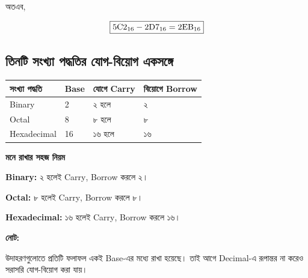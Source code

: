 অতএব,

\[
\boxed{
5\text{\textenglish{C}}2_{16}
-
2\text{\textenglish{D}}7_{16}
=
2\text{\textenglish{EB}}_{16}
}
\]


\subsection{তিনটি সংখ্যা পদ্ধতির যোগ-বিয়োগ একসঙ্গে}

\begin{center}
\begin{tabularx}{\textwidth}{|Y|C{0.13\textwidth}|Y|Y|}
\hline
{}
\textbf{সংখ্যা পদ্ধতি} &
\textbf{\textenglish{Base}} &
\textbf{যোগে \textenglish{Carry}} &
\textbf{বিয়োগে \textenglish{Borrow}} \\
\hline

\textenglish{Binary} &
2 &
২ হলে &
২ \\
\hline

\textenglish{Octal} &
8 &
৮ হলে &
৮ \\
\hline

\textenglish{Hexadecimal} &
16 &
১৬ হলে &
১৬ \\
\hline

\end{tabularx}
\end{center}


\par\begingroup

\textbf{মনে রাখার সহজ নিয়ম}

\textbf{\textenglish{Binary}:}
২ হলেই \textenglish{Carry},
\textenglish{Borrow} করলে ২।

\textbf{\textenglish{Octal}:}
৮ হলেই \textenglish{Carry},
\textenglish{Borrow} করলে ৮।

\textbf{\textenglish{Hexadecimal}:}
১৬ হলেই \textenglish{Carry},
\textenglish{Borrow} করলে ১৬।
\par\endgroup


\par\begingroup

\textbf{নোট:}

উদাহরণগুলোতে প্রতিটি ফলাফল একই
\textenglish{Base}-এর মধ্যে রাখা হয়েছে।
তাই আগে \textenglish{Decimal}-এ রূপান্তর না করেও
সরাসরি যোগ-বিয়োগ করা যায়।
\par\endgroup


